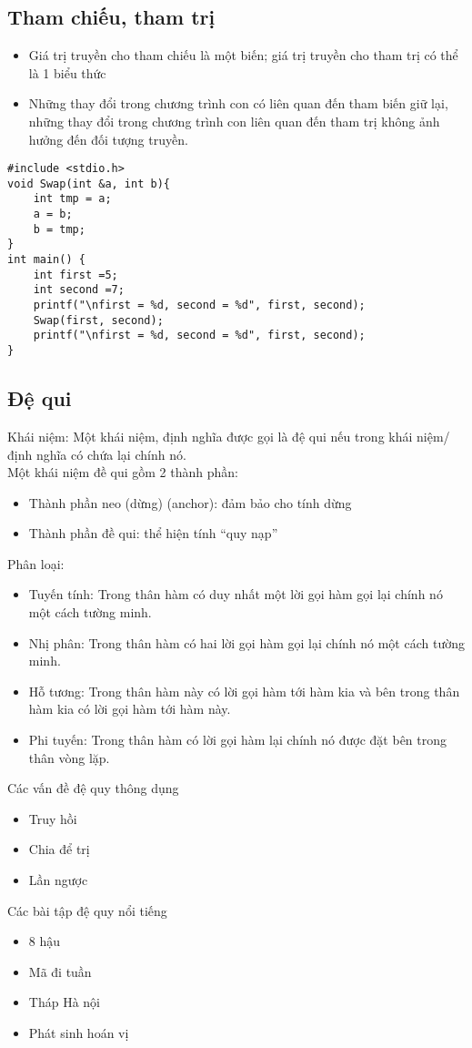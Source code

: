\documentclass[12pt,a4paper]{article}
\begin{document}
\subsection{Tham chiếu, tham trị}
\begin{itemize}
	\item
	Giá trị truyền cho tham chiếu là một biến; giá trị truyền cho tham trị có thể là 1
biểu thức
	\item
	Những thay đổi trong chương trình con có liên quan đến tham biến giữ lại, những
thay đổi trong chương trình con liên quan đến tham trị không ảnh hưởng đến đối
tượng truyền.
\end{itemize}

\begin{lstlisting}
#include <stdio.h>
void Swap(int &a, int b){
	int tmp = a;
	a = b;
	b = tmp;
}
int main() {
	int first =5;
	int second =7;
	printf("\nfirst = %d, second = %d", first, second);
	Swap(first, second);
	printf("\nfirst = %d, second = %d", first, second);
}
\end{lstlisting}
\subsection{Đệ qui}
Khái niệm: Một khái niệm, định nghĩa được gọi là đệ qui nếu trong khái niệm/định nghĩa có chứa lại chính nó.\\
Một khái niệm đề qui gồm 2 thành phần:
\begin{itemize}
	\item
	Thành phần neo (dừng) (anchor): đảm bảo cho tính dừng
	\item
	Thành phần đề qui: thể hiện tính “quy nạp”
\end{itemize}
Phân loại:
\begin{itemize}
	\item Tuyến tính: Trong thân hàm có duy nhất một lời gọi hàm gọi lại chính nó một cách tường minh.
	\item Nhị phân: Trong thân hàm có hai lời gọi hàm gọi lại chính nó một cách tường minh.
	\item Hỗ tương: Trong thân hàm này có lời gọi hàm tới hàm kia và bên trong thân hàm kia có lời gọi hàm tới hàm này.
	\item Phi tuyến: Trong thân hàm có lời gọi hàm lại chính nó được đặt bên trong thân vòng lặp.
\end{itemize}
Các vấn đề đệ quy thông dụng
\begin{itemize}
	\item Truy hồi
	\item Chia để trị
	\item Lần ngược
\end{itemize}
Các bài tập đệ quy nổi tiếng
\begin{itemize}
	\item 8 hậu
	\item Mã đi tuần
	\item Tháp Hà nội
	\item Phát sinh hoán vị
\end{itemize}
\vspace{5cm}
\end{document}
